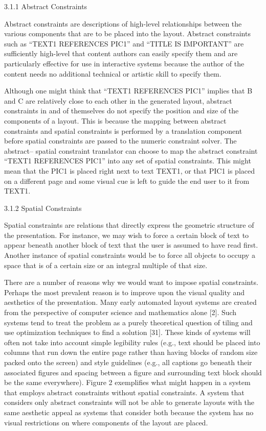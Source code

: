     3.1.1 Abstract Constraints

    Abstract constraints are descriptions of high-level relationships between the various components that are to be placed into the layout. Abstract constraints such as “TEXT1 REFERENCES PIC1” and “TITLE IS IMPORTANT” are sufficiently high-level that content authors can easily specify them and are particularly effective for use in interactive systems because the author of the content needs no additional technical or artistic skill to specify them.

    Although one might think that “TEXT1 REFERENCES PIC1” implies that B and C are relatively close to each other in the generated layout, abstract constraints in and of themselves do not specify the position and size of the components of a layout. This is because the mapping between abstract constraints and spatial constraints is performed by a translation component before spatial constraints are passed to the numeric constraint solver. The abstract– spatial constraint translator can choose to map the abstract constraint “TEXT1 REFERENCES PIC1” into any set of spatial constraints. This might mean that the PIC1 is placed right next to text TEXT1, or that PIC1 is placed on a different page and some visual cue is left to guide the end user to it from TEXT1.

    3.1.2 Spatial Constraints

    Spatial constraints are relations that directly express the geometric structure of the presentation. For instance, we may wish to force a certain block of text to appear beneath another block of text that the user is assumed to have read first. Another instance of spatial constraints would be to force all objects to occupy a space that is of a certain size or an integral multiple of that size.

    There are a number of reasons why we would want to impose spatial constraints. Perhaps the most prevalent reason is to improve upon the visual quality and aesthetics of the presentation. Many early automated layout systems are created from the perspective of computer science and mathematics alone [2]. Such systems tend to treat the problem as a purely theoretical question of tiling and use optimization techniques to find a solution [31]. These kinds of systems will often not take into account simple legibility rules (e.g., text should be placed into columns that run down the entire page rather than having blocks of random size packed onto the screen) and style guidelines (e.g., all captions go beneath their associated figures and spacing between a figure and surrounding text block should be the same everywhere). Figure 2 exemplifies what might happen in a system that employs abstract constraints without spatial constraints. A system that considers only abstract constraints will not be able to generate layouts with the same aesthetic appeal as systems that consider both because the system has no visual restrictions on where components of the layout are placed.


